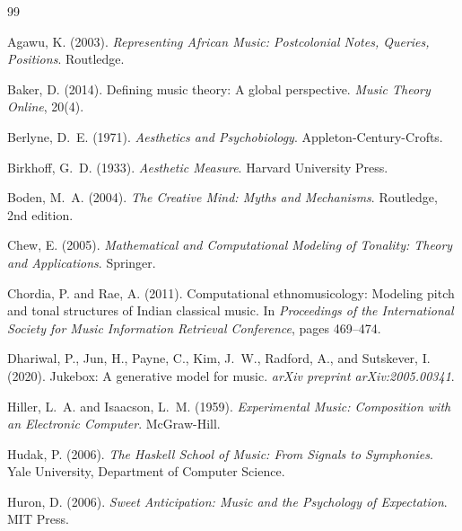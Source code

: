 \documentclass[cmj]{article}
\begin{document}
\begin{thebibliography}{99}

Agawu, K. (2003).
\newblock \emph{Representing African Music: Postcolonial Notes, Queries, Positions}.
\newblock Routledge.

Baker, D. (2014).
\newblock Defining music theory: A global perspective.
\newblock \emph{Music Theory Online}, 20(4).

Berlyne, D.~E. (1971).
\newblock \emph{Aesthetics and Psychobiology}.
\newblock Appleton-Century-Crofts.

Birkhoff, G.~D. (1933).
\newblock \emph{Aesthetic Measure}.
\newblock Harvard University Press.

Boden, M.~A. (2004).
\newblock \emph{The Creative Mind: Myths and Mechanisms}.
\newblock Routledge, 2nd edition.

Chew, E. (2005).
\newblock \emph{Mathematical and Computational Modeling of Tonality: Theory and Applications}.
\newblock Springer.

Chordia, P. and Rae, A. (2011).
\newblock Computational ethnomusicology: Modeling pitch and tonal structures of Indian classical music.
\newblock In \emph{Proceedings of the International Society for Music Information Retrieval Conference}, pages 469--474.

Dhariwal, P., Jun, H., Payne, C., Kim, J.~W., Radford, A., and Sutskever, I. (2020).
\newblock Jukebox: A generative model for music.
\newblock \emph{arXiv preprint arXiv:2005.00341}.

Hiller, L.~A. and Isaacson, L.~M. (1959).
\newblock \emph{Experimental Music: Composition with an Electronic Computer}.
\newblock McGraw-Hill.

Hudak, P. (2006).
\newblock \emph{The Haskell School of Music: From Signals to Symphonies}.
\newblock Yale University, Department of Computer Science.

Huron, D. (2006).
\newblock \emph{Sweet Anticipation: Music and the Psychology of Expectation}.
\newblock MIT Press.


\end{thebibliography}
\end{document}
